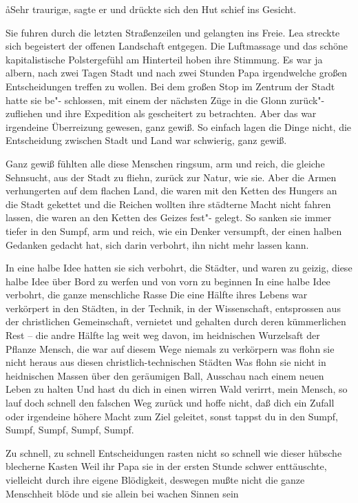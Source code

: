 \aa{}Sehr traurig\ae{}, sagte er und drückte sich den Hut schief ins
Gesicht.

Sie fuhren durch die letzten Straßenzeilen und gelangten
ins Freie. Lea streckte sich begeistert der offenen Landschaft
entgegen. Die Luftmassage und das schöne kapitalistische
Polstergefühl am Hinterteil hoben ihre Stimmung. Es war
ja albern, nach zwei Tagen Stadt und nach zwei Stunden
Papa irgendwelche großen Entscheidungen treffen zu wollen.
Bei dem großen Stop im Zentrum der Stadt hatte sie be"-%
schlossen, mit einem der nächsten Züge in die Glonn zurück"-%
zufliehen und ihre Expedition als gescheitert zu betrachten.
Aber das war irgendeine Überreizung gewesen, ganz gewiß.
So einfach lagen die Dinge nicht, die Entscheidung zwischen
Stadt und Land war schwierig, ganz gewiß.

Ganz gewiß fühlten alle diese Menschen ringsum, arm und
reich, die gleiche Sehnsucht, aus der Stadt zu fliehn, zurück
zur Natur, wie sie. Aber die Armen verhungerten auf dem
flachen Land, die waren mit den Ketten des Hungers an die
Stadt gekettet\semi{} und die Reichen wollten ihre städterne Macht
nicht fahren lassen, die waren an den Ketten des Geizes fest"-%
gelegt. So sanken sie immer tiefer in den Sumpf, arm und
reich, wie ein Denker versumpft, der einen halben Gedanken
gedacht hat, sich darin verbohrt, ihn nicht mehr lassen kann.

In eine halbe Idee hatten sie sich verbohrt, die Städter,
und waren zu geizig, diese halbe Idee über Bord zu werfen
und von vorn zu beginnen\ausr{} In eine halbe Idee verbohrt, die
ganze menschliche Rasse\ausr{} Die eine Hälfte ihres Lebens war
verkörpert in den Städten, in der Technik, in der Wissenschaft,
entsprossen aus der christlichen Gemeinschaft, vernietet und
gehalten durch deren kümmerlichen Rest -- die andre Hälfte
lag weit weg davon, im heidnischen Wurzelsaft der Pflanze
Mensch, die war auf diesem Wege niemals zu verkörpern\dopp{}
was flohn sie nicht heraus aus diesen christlich-technischen
Städten\frag{} Was flohn sie nicht in heidnischen Massen über den
geräumigen Ball, Ausschau nach einem neuen Leben zu
halten\frag{} Und hast du dich in einen wirren Wald verirrt, mein
Mensch, so lauf doch schnell den falschen Weg zurück und hoffe
nicht, daß dich ein Zufall oder irgendeine höhere Macht zum
Ziel geleitet, sonst tappst du in den Sumpf, Sumpf, Sumpf,
Sumpf, Sumpf.

Zu schnell, zu schnell\ausr{} Entscheidungen rasten nicht so schnell
wie dieser hübsche blecherne Kasten\ausr{} Weil ihr Papa sie in der
ersten Stunde schwer enttäuschte, vielleicht durch ihre eigene
Blödigkeit, deswegen mußte nicht die ganze Menschheit
blöde und sie allein bei wachen Sinnen sein\ausr{}

